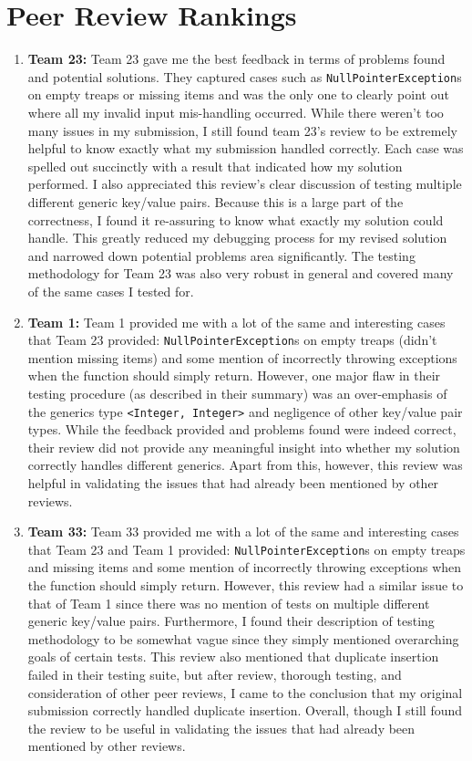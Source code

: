 \documentclass[11pt]{article}
\def\tt{\texttt}
\begin{document}
\section{Peer Review Rankings}
\begin{enumerate}
    \item \textbf{Team 23:} Team 23 gave me the best feedback in terms of problems found and potential solutions. They captured cases such as
    \tt{NullPointerException}s on empty treaps or missing items and was the only one to clearly point out where all my invalid input mis-handling occurred. While there weren't too many issues in my submission, I still found team 23's review to be extremely helpful to know exactly what my submission handled correctly. Each case was spelled out succinctly with a result that indicated how my solution performed. I also appreciated this review's clear discussion of testing multiple different generic key/value pairs. Because this is a large part of the correctness, I found it re-assuring to know what exactly my solution could handle. This greatly reduced my debugging process for my revised solution and narrowed down potential problems area significantly. The testing methodology for Team 23 was also very robust in general and covered many of the same cases I tested for.
    
    
    \item \textbf{Team 1:} Team 1 provided me with a lot of the same and interesting cases that Team 23 provided: \tt{NullPointerException}s on empty treaps (didn't mention missing items) and some mention of incorrectly throwing exceptions when the function should simply return. However, one major flaw in their testing procedure (as described in their summary) was an over-emphasis of the generics type \tt{<Integer, Integer>} and negligence of other key/value pair types. While the feedback provided and problems found were indeed correct, their review did not provide any meaningful insight into whether my solution correctly handles different generics. Apart from this, however, this review was helpful in validating the issues that had already been mentioned by other reviews.
    
    \item \textbf{Team 33:} Team 33 provided me with a lot of the same and interesting cases that Team 23 and Team 1 provided: \tt{NullPointerException}s on empty treaps and missing items and some mention of incorrectly throwing exceptions when the function should simply return. However, this review had a similar issue to that of Team 1 since there was no mention of tests on multiple different generic key/value pairs. Furthermore, I found their description of testing methodology to be somewhat vague since they simply mentioned overarching goals of certain tests. This review also mentioned that duplicate insertion failed in their testing suite, but after review, thorough testing, and consideration of other peer reviews, I came to the conclusion that my original submission correctly handled duplicate insertion. Overall, though I still found the review to be useful in validating the issues that had already been mentioned by other reviews.
    

\end{enumerate}
\end{document}
